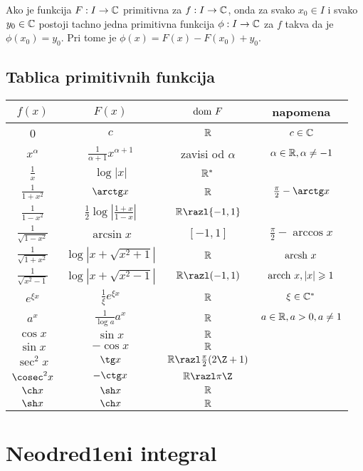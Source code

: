 \documentclass[../main_og.tex]{subfiles}
\begin{document}
\begin{posl}
Ako je funkcija $F:I \to \mathbb{C}$ primitivna za $f: I \to \mathbb{C}$, onda za svako $x_0 \in I$ i svako $y_0 \in \mathbb{C}$ postoji tachno jedna primitivna funkcija $\phi : I \to \mathbb{C}$ za $f$ takva da je $\phi (x_0) = y_0$. Pri tome je $\phi(x)=F(x)-F(x_0)+y_0$.
\end{posl}
\newpage
\subsection{Tablica primitivnih funkcija}
\begin{center}
\vspace{0.5cm}
\begin{tabular}{||c  c  c  c||} 
 \hline
 $f(x)$ & $F(x)$ & $\text{\latin {dom }}F$ & napomena \\ [0.5ex] 
 \hline\hline
 0 & $c$ & $\mathbb{R}$ & $c\in \mathbb{C}$ \\ [2ex] 
 $x^{\alpha}$ & $\frac{1}{\alpha +1} x^{\alpha +1}$ & zavisi od $\alpha$ & $\alpha \in \mathbb{R} , \alpha \ne -1$ \\[2ex] 
 $\frac{1}{x}$ & $\log|x|$ & $\mathbb{R}^{*}$ &  \\[2ex] 
 $\frac{1}{1+x^2}$ & $\arctg x$ & $\mathbb{R}$ & $\frac{\pi}{2} -\arctg x$ \\[2ex] 
  $\frac{1}{1-x^2}$ & $\frac{1}{2} \log |\frac{1+x}{1-x}|$ & $\R \razl \{-1,1\} $ &  \\ [2ex] 
 $\frac{1}{\sqrt{1-x^2}}$ & $\arcsin x$ & $[-1,1]$ & $\frac{\pi}{2}-\arccos x$ \\ [2ex] 
 $\frac{1}{\sqrt{1+x^2}}$ & $\log |x+\sqrt{x^2+1}|$ & $ \mathbb{R} $ & $\text{\latin {arcsh }} x$\\[2ex] 
 $\frac{1}{\sqrt{x^2-1}}$ & $\log |x+\sqrt{x^2-1}|$ & $\R\razl(-1,1)$ & $\text{\latin {arcch }} x, |x|\geqslant 1$ \\[2ex] 
 $e^{\xi x}$ & $\frac{1}{\xi} e^{\xi x}$ & $\mathbb{R}$ & $\xi \in \mathbb{C}^{*}$ \\[2ex] 
  $a^x$ & $\frac{1}{\log a} a^x $ & $\mathbb{R} $ & $a\in \mathbb{R}, a>0, a\ne 1$ \\ [2ex] 
  $\cos x$ & $\sin x$ & $\mathbb{R}$ &  \\ [2ex] 
 $\sin x$ & $ -\cos x$ & $\mathbb{R}$ &\\[2ex] 
 $\sec^2 x$ & $\tg x$ & $\R \razl \frac{\pi}{2}(2\Z+1)$ &  \\[2ex]
 $\cosec^2 x$ & $-\ctg x$ & $\R \razl \pi \Z$ &  \\[2ex] 
  $\ch x$ & $\sh x$ & $\mathbb{R} $ &  \\ [2ex] 
  $\sh x$ & $\ch x$ & $\mathbb{R} $ &  \\ [2ex] 
 \hline
\end{tabular}
\end{center}
\section {Neodred1eni integral}
\end{document}
